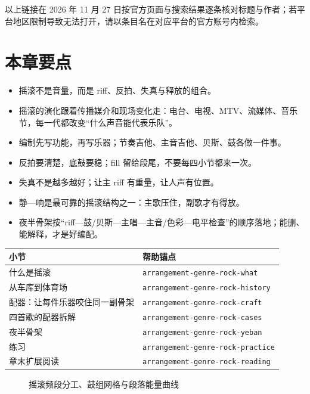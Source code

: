 以上链接在 2026 年 11 月 27 日按官方页面与搜索结果逐条核对标题与作者；若平台地区限制导致无法打开，请以条目名在对应平台的官方账号内检索。

\section{本章要点}
\label{sec:rock-takeaways}

\begin{itemize}
\item 摇滚不是音量，而是 riff、反拍、失真与释放的组合。
\item 摇滚的演化跟着传播媒介和现场变化走：电台、电视、MTV、流媒体、音乐节，每一代都改变“什么声音能代表乐队”。
\item 编制先写功能，再写乐器；节奏吉他、主音吉他、贝斯、鼓各做一件事。
\item 反拍要清楚，底鼓要稳；fill 留给段尾，不要每四小节都来一次。
\item 失真不是越多越好；让主 riff 有重量，让人声有位置。
\item 静—响是最可靠的摇滚结构之一：主歌压住，副歌才有得放。
\item 夜半骨架按“riff—鼓/贝斯—主唱—主音/色彩—电平检查”的顺序落地；能删、能解释，才是好编配。
\end{itemize}

\begin{helpmapping}
\begin{longtable}{p{}p{}}
\toprule
小节 & 帮助锚点 \\
\midrule
什么是摇滚 & \texttt{arrangement-genre-rock-what} \\
从车库到体育场 & \texttt{arrangement-genre-rock-history} \\
配器：让每件乐器咬住同一副骨架 & \texttt{arrangement-genre-rock-craft} \\
四首歌的配器拆解 & \texttt{arrangement-genre-rock-cases} \\
夜半骨架 & \texttt{arrangement-genre-rock-yeban} \\
练习 & \texttt{arrangement-genre-rock-practice} \\
章末扩展阅读 & \texttt{arrangement-genre-rock-reading} \\
\bottomrule
\end{longtable}
\end{helpmapping}

\begin{figure}[htbp]\centering
{}
\caption{摇滚频段分工、鼓组网格与段落能量曲线}
\end{figure}
